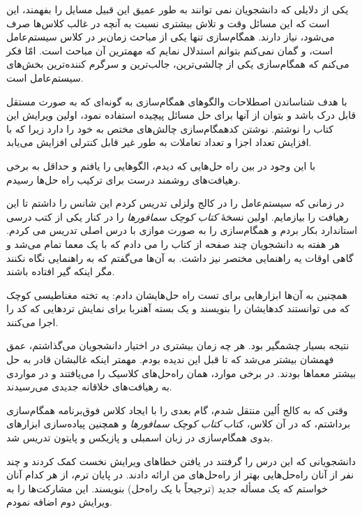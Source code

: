 \documentclass{book}
\begin{document}
یکی از دلایلی که دانشجویان نمی توانند به طور عمیق این قبیل مسایل را بفهمند، این است که این مسائل وقت و تلاش بیشتری نسبت به 
آنچه در غالب کلاس‌ها صرف می‌شود، نیاز دارند. 
همگام‌سازی تنها یکی از مباحث زمان‌بر در کلاس سیستم‌عامل  است،
و گمان نمی‌کنم بتوانم استدلال نمایم که مهمترین آن مباحث است. 
امّا فکر می‌کنم که همگام‌سازی یکی از چالشی‌ترین، جالب‌ترین و سرگرم‌ کننده‌ترین بخش‌های سیستم‌عامل است.

با هدف شناساندن  اصطلاحات والگوهای همگام‌سازی به گونه‌ای که به صورت مستقل قابل درک باشد و بتوان از آنها برای حل مسائل پیچیده استفاده نمود، 
اولین ویرایش این کتاب را نوشتم.
نوشتن کدهمگام‌سازی چالش‌های مختص به خود را دارد زیرا که با افزایش تعداد اجزا و تعداد تعاملات به طور غیر قابل کنترلی افزایش می‌‌یابد.

با این وجود در بین راه حل‌هایی که دیدم، الگوهایی را یافتم و حداقل به برخی رهیافت‌های روشمند درست برای ترکیب راه حل‌ها رسیدم.

در زمانی که سیستم‌عامل را در کالج ولزلی تدریس کردم این شانس را داشتم تا این رهیافت را بیازمایم. 
اولین نسخهٔ \emph{کتاب کوچک سمافورها} را در کنار یکی از کتب درسی استاندارد بکار بردم و همگام‌سازی را به صورت موازی با درس اصلی تدریس می کردم.
هر هفته به دانشجویان چند صفحه از کتاب را می دادم که با یک معما تمام می‌شد و گاهی اوقات یه راهنمایی مختصر نیز داشت. 
به آن‌ها می‌گفتم که به راهنمایی نگاه نکنند مگر اینکه گیر افتاده باشند.

همچنین به آن‌ها ابزارهایی برای تست راه حل‌هایشان دادم: 
یه تخته مغناطیسی کوچک که می توانستند کدهایشان را بنویسند و یک بسته آهنربا برای نمایش تردهایی که کد را اجرا می‌کنند.

نتیجه بسیار چشمگیر بود. 
هر چه زمان بیشتری در اختیار دانشجویان می‌گذاشتم، عمق فهمشان بیشتر می‌شد که تا قبل این ندیده بودم. 
    مهمتر اینکه غالبشان قادر به حل بیشتر معماها بودند.
    در برخی موارد،‌ همان راه‌حل‌های کلاسیک را می‌یافتند و در مواردی به رهیافت‌های خلاقانه جدیدی می‌رسیدند. 
    
وقتی که به کالج اُلین منتقل شدم،‌ 
گام بعدی را با ایجاد کلاس فوق‌برنامه همگام‌سازی برداشتم، که در آن کلاس، کتاب \emph{کتاب کوچک سمافورها}  
و همچنین پیاده‌سازی ابزارهای بدوی همگام‌سازی در زبان اسمبلی  و پازیکس و پایتون تدریس شد.

دانشجویانی که این درس را گرفتند در یافتن خطاهای ویرایش نخست کمک کردند و چند نفر از آنان راه‌حل‌هایی بهتر از راه‌حل‌های من ارائه دادند. 
در پایان ترم، از هر کدام آنان خواستم که یک مسأله جدید (ترجیحاً با یک راه‌حل) بنویسند. این مشارکت‌ها را به ویرایش دوم اضافه نمودم. 
\end{document}
